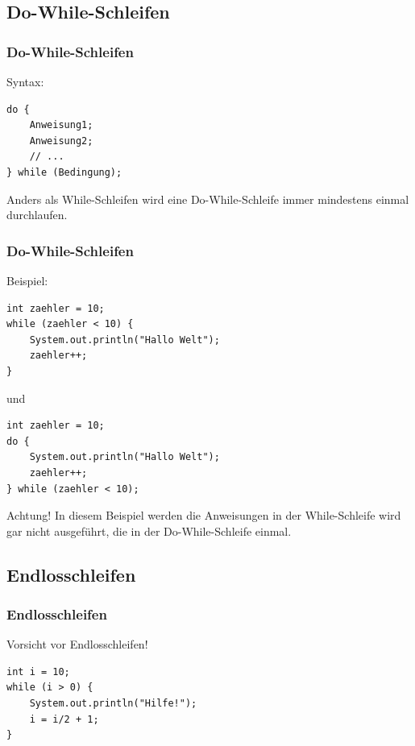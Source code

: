 \documentclass[final]{beamer}
\begin{document}
\subsection{Do-While-Schleifen}
\begin{frame}[containsverbatim]
	\frametitle{Do-While-Schleifen}
	Syntax:
	\begin{lstlisting}
do {
	Anweisung1;
	Anweisung2;
	// ...
} while (Bedingung);
	\end{lstlisting}
	Anders als While-Schleifen wird eine Do-While-Schleife immer mindestens einmal durchlaufen.
\end{frame}
\begin{frame}[containsverbatim]
	\frametitle{Do-While-Schleifen}
	Beispiel:
	\begin{lstlisting}
int zaehler = 10;
while (zaehler < 10) {
	System.out.println("Hallo Welt");
	zaehler++;
}
	\end{lstlisting}
	und
	\begin{lstlisting}
int zaehler = 10;
do {
	System.out.println("Hallo Welt");
	zaehler++;
} while (zaehler < 10);
\end{lstlisting}
	\begin{alertblock}{Achtung!}
		In diesem Beispiel werden die Anweisungen in der While-Schleife wird gar nicht ausgeführt, die in der Do-While-Schleife einmal.
	\end{alertblock}
\end{frame}

\subsection{Endlosschleifen}
\begin{frame}[containsverbatim]
	\frametitle{Endlosschleifen}
	Vorsicht vor Endlosschleifen!
	\begin{lstlisting}
int i = 10;
while (i > 0) {
	System.out.println("Hilfe!");
	i = i/2 + 1;
}
	\end{lstlisting}
\end{frame}
\end{document}
